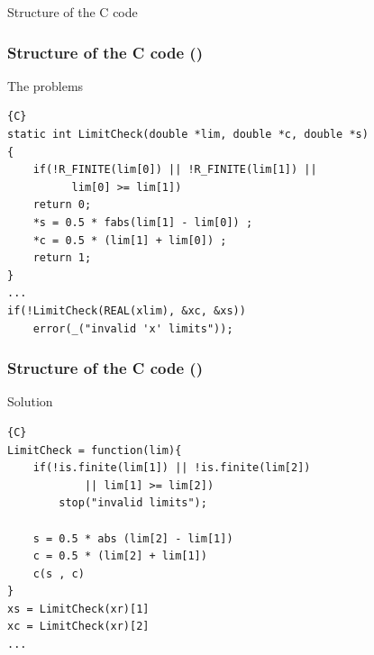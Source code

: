 \documentclass{beamer}
\begin{document}

\begin{frame}[fragile]
\begin{center}
\Huge Structure of the C code
\end{center}
\end{frame}


\begin{frame}[fragile]
\frametitle{Structure of the \textbf{C} code ()}
\begin{block}{The problems}
\begin{lstlisting}{C}
static int LimitCheck(double *lim, double *c, double *s)
{
    if(!R_FINITE(lim[0]) || !R_FINITE(lim[1]) || 
          lim[0] >= lim[1])
    return 0;
    *s = 0.5 * fabs(lim[1] - lim[0]) ;
    *c = 0.5 * (lim[1] + lim[0]) ;
    return 1;
}
...
if(!LimitCheck(REAL(xlim), &xc, &xs))
	error(_("invalid 'x' limits"));
\end{lstlisting}
\end{block}

\end{frame}



\begin{frame}[fragile]
\frametitle{Structure of the \textbf{C} code ()}
\begin{block}{Solution}
\begin{lstlisting}{C}
LimitCheck = function(lim){
    if(!is.finite(lim[1]) || !is.finite(lim[2]) 
            || lim[1] >= lim[2])
        stop("invalid limits");
      
    s = 0.5 * abs (lim[2] - lim[1])
    c = 0.5 * (lim[2] + lim[1])
    c(s , c)
}
xs = LimitCheck(xr)[1]
xc = LimitCheck(xr)[2]
...
\end{lstlisting}
\end{block}

\end{frame}


\end{document}
